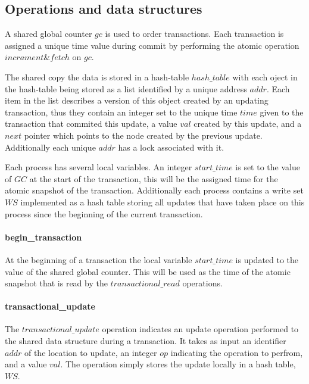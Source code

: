 \documentclass[11pt,letterpaper]{article}
\begin{document}
\subsection{Operations and data structures}
A shared global counter $\mathit{gc}$ is used to order transactions.
Each transaction is assigned a unique time value during commit by performing the atomic
operation $\mathit{incrament\&fetch}$ on $\mathit{gc}$.


The shared copy the data is stored in a hash-table
$\mathit{hash\_table}$ with each oject in the hash-table
being stored as a list identified by a unique address $\mathit{addr}$.
Each item in the list describes a version of this object created
by an updating transaction, thus they contain an integer
set to the unique time $\mathit{time}$ given to the transaction that commited this
update, a value $\mathit{val}$ created by this update, and a $\mathit{next}$ pointer
which points to the node created by the previous update.
Additionally each unique $\mathit{addr}$ has a lock associated with it.


Each process has several local variables.
An integer $\mathit{start\_time}$ is set to the value of $\mathit{GC}$
at the start of the transaction,
this will be the assigned time for the atomic snapshot of the transaction.
Additionally each process contains a write set $\mathit{WS}$
implemented as a hash table
storing all updates that have taken place on this process
since the beginning of the current transaction.

\paragraph{begin\_transaction}
At the beginning of a transaction the local variable $\mathit{start\_time}$
is updated to the value of the shared global counter.
This will be used as the time of the atomic snapshot that is read
by the $\mathit{transactional\_read}$ operations.

\paragraph{transactional\_update}
The $\mathit{transactional\_update}$ operation indicates an update operation
performed to the shared data structure during a transaction.
It takes as input an identifier $\mathit{addr}$ of the location to update,
an integer $\mathit{op}$ indicating the operation to perfrom, and a value $\mathit{val}$.
The operation simply stores the update locally in a hash table, $\mathit{WS}$.
\end{document}
